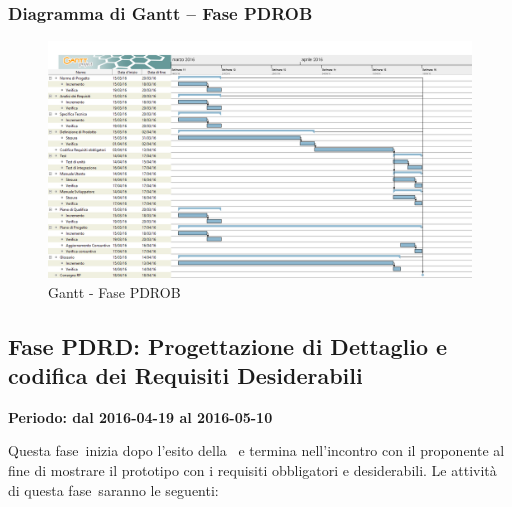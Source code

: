 \documentclass[../PianoProgetto.tex]{subfiles}
\begin{document}
		\subsubsection{Diagramma di Gantt – Fase PDROB}
			\begin{figure}[!h]
				\centering
				\includegraphics[width=\textwidth]{gantt_png/4-requisiti_obbligatori}
				\caption{Gantt - Fase PDROB}
				\label{fig:Gantt - Fase PDROB}
			\end{figure}
\newpage
	\subsection{Fase PDRD: Progettazione di Dettaglio e codifica dei Requisiti Desiderabili}
		\textbf{Periodo: dal 2016-04-19 al 2016-05-10}
		
		Questa fase\g\ inizia dopo l'esito della \revisionediprogettazione\ e termina nell'incontro con il proponente al fine di mostrare il prototipo con i requisiti obbligatori e desiderabili. Le attività di questa fase\g\ saranno le seguenti:
\end{document}
